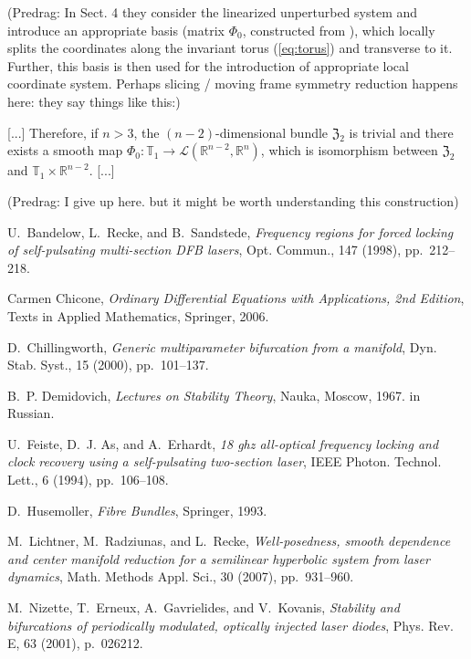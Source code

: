 \begin{description}
(Predrag: In Sect. 4 they consider the linearized unperturbed system and introduce
an appropriate basis (matrix $\Phi_{0}$, constructed from ),
which locally splits the coordinates along the invariant torus
(\ref{eq:torus}) and transverse to it. Further, this basis is then used
for the introduction of appropriate local coordinate system. Perhaps slicing
 / moving frame symmetry reduction happens here: they say things like this:)

[...]
Therefore, if $n>3$, the $(n-2)$-dimensional
bundle $\mathfrak{Z}_{2}$ is trivial and there exists a smooth map
$\Phi_{0}:\mathbb{T}_{1}\to\mathcal{L}(\mathbb{R}^{n-2},\mathbb{R}^{n})$,
which is isomorphism between $\mathfrak{Z}_{2}$ and $\mathbb{T}_{1}\times\mathbb{R}^{n-2}.$
[...]

(Predrag: I give up here. but it might be worth understanding this construction)




\begin{thebibliography}{10}
{\sc U.~Bandelow, L.~Recke, and B.~Sandstede}, {\em Frequency regions for
  forced locking of self-pulsating multi-section {DFB} lasers}, Opt. Commun.,
  147 (1998), pp.~212--218.

{\sc Carmen Chicone}, {\em Ordinary Differential Equations with Applications,
  2nd Edition}, Texts in Applied Mathematics, Springer, 2006.

{\sc D.~Chillingworth}, {\em Generic multiparameter bifurcation from a
  manifold}, Dyn. Stab. Syst., 15 (2000), pp.~101--137.

{\sc B.~P. Demidovich}, {\em Lectures on Stability Theory}, Nauka, Moscow,
  1967.
\newblock in Russian.

{\sc U.~Feiste, D.~J. As, and A.~Erhardt}, {\em 18 ghz all-optical frequency
  locking and clock recovery using a self-pulsating two-section laser}, IEEE
  Photon. Technol. Lett., 6 (1994), pp.~106--108.

{\sc D.~Husemoller}, {\em Fibre Bundles}, Springer, 1993.

{\sc M.~Lichtner, M.~Radziunas, and L.~Recke}, {\em Well-posedness, smooth
  dependence and center manifold reduction for a semilinear hyperbolic system
  from laser dynamics}, Math. Methods Appl. Sci., 30 (2007), pp.~931--960.

{\sc M.~Nizette, T.~Erneux, A.~Gavrielides, and V.~Kovanis}, {\em Stability and
  bifurcations of periodically modulated, optically injected laser diodes},
  Phys. Rev. E, 63 (2001), p.~026212.


\end{thebibliography}
\end{description}
